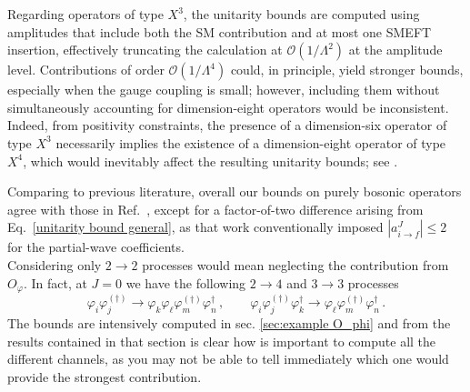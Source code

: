 \documentclass[a4paper,11pt]{article}
\begin{document}
Regarding operators of type $X^3$, the unitarity bounds are computed using amplitudes that include both the SM contribution and at most one SMEFT insertion, effectively truncating the calculation at $\mathcal{O}(1/\Lambda^2)$ at the amplitude level. 
Contributions of order $\mathcal{O}(1/\Lambda^4)$ could, in principle, yield stronger bounds, especially when the gauge coupling is small; however, including them without simultaneously accounting for dimension-eight operators would be inconsistent.
Indeed, from positivity constraints, the presence of a dimension-six operator of type $X^3$ necessarily implies the existence of a dimension-eight operator of type $X^4$, which would inevitably affect the resulting unitarity bounds; see \cite{Ghosh:2022qqq}.

Comparing to previous literature, overall our bounds on purely bosonic operators agree with those in Ref.~\cite{Cao:2023qks}, except for a factor-of-two difference arising from Eq.~\eqref{unitarity bound general}, as that work conventionally imposed $|a_{i\to f}^J|\leq 2$ for the partial-wave coefficients. \\

Considering only $2\to 2$ processes would mean neglecting the contribution from $O_{\varphi}$. In fact, at $J=0$ we have the following $2\to4$ and $3\to3$ processes
\begin{equation}
    \varphi_i\varphi_j^{(\dag)}\to \varphi_k\varphi_\ell\varphi_m^{(\dag)}\varphi^\dag_n\,,\qquad\varphi_i\varphi_j^{(\dag)}\varphi_k^{\dag}\to\varphi_\ell\varphi_m^{(\dag)}\varphi_n^\dag\,.
\end{equation}
The bounds are intensively computed in sec. \ref{sec:example O_phi} and from the results contained in that section is clear how is important to compute all the different channels, as you may not be able to tell immediately which one would provide the strongest contribution. 
\end{document}
